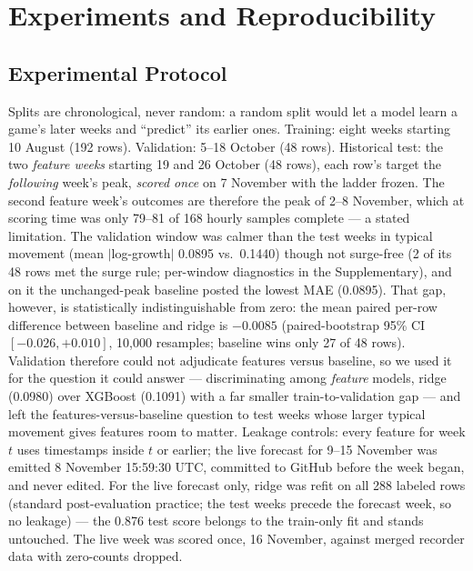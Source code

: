 \documentclass[10pt,letterpaper]{article}
\begin{document}
\section{Experiments and Reproducibility}
\subsection{Experimental Protocol}
Splits are chronological, never random: a random split would let a model learn a game's later weeks and ``predict'' its earlier ones. Training: eight weeks starting 10 August (192 rows). Validation: 5--18 October (48 rows). Historical test: the two \emph{feature weeks} starting 19 and 26 October (48 rows), each row's target the \emph{following} week's peak, \emph{scored once} on 7 November with the ladder frozen. The second feature week's outcomes are therefore the peak of 2--8 November, which at scoring time was only 79--81 of 168 hourly samples complete --- a stated limitation. The validation window was calmer than the test weeks in typical movement (mean $|$log-growth$|$ 0.0895 vs.\ 0.1440) though not surge-free (2 of its 48 rows met the surge rule; per-window diagnostics in the Supplementary), and on it the unchanged-peak baseline posted the lowest MAE (0.0895). That gap, however, is statistically indistinguishable from zero: the mean paired per-row difference between baseline and ridge is $-0.0085$ (paired-bootstrap 95\% CI $[-0.026, +0.010]$, 10{,}000 resamples; baseline wins only 27 of 48 rows). Validation therefore could not adjudicate features versus baseline, so we used it for the question it could answer --- discriminating among \emph{feature} models, ridge (0.0980) over XGBoost (0.1091) with a far smaller train-to-validation gap --- and left the features-versus-baseline question to test weeks whose larger typical movement gives features room to matter. Leakage controls: every feature for week $t$ uses timestamps inside $t$ or earlier; the live forecast for 9--15 November was emitted 8 November 15:59:30 UTC, committed to GitHub before the week began, and never edited. For the live forecast only, ridge was refit on all 288 labeled rows (standard post-evaluation practice; the test weeks precede the forecast week, so no leakage) --- the 0.876 test score belongs to the train-only fit and stands untouched. The live week was scored once, 16 November, against merged recorder data with zero-counts dropped.
\end{document}

